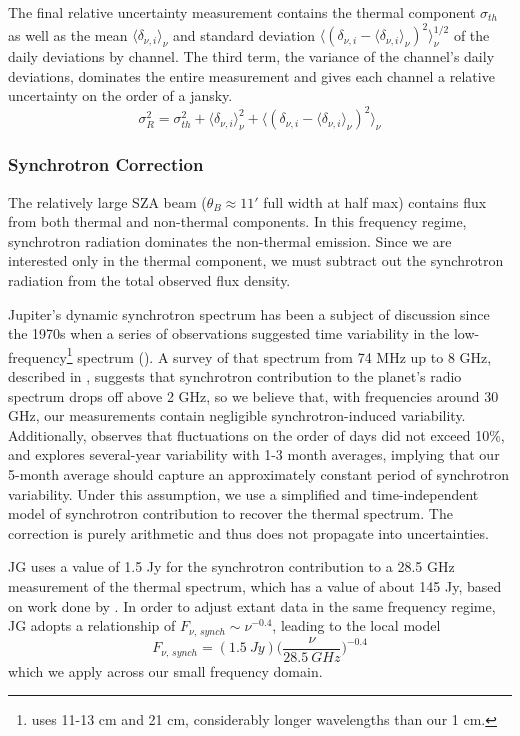 \documentclass{article}
\begin{document}
	The final relative uncertainty measurement contains the thermal component $\sigma_{th}$ as well as the mean $\langle \delta_{\nu, i} \rangle_{\nu}$ and standard deviation $\Big\langle (\delta_{\nu, i} - \langle \delta_{\nu, i} \rangle_{\nu})^{2} \Big\rangle_{\nu}^{1/2}$ of the daily deviations by channel.
	The third term, the variance of the channel's daily deviations, dominates the entire measurement and gives each channel a relative uncertainty on the order of a jansky.
	$$ \sigma_{R}^{2} = \sigma_{th}^{2} + \langle \delta_{\nu, i} \rangle_{\nu}^{2}
		 + \Big\langle (\delta_{\nu, i} - \langle \delta_{\nu, i} \rangle_{\nu})^{2} \Big\rangle_{\nu} $$


\subsubsection{Synchrotron Correction}

	The relatively large SZA beam ($\theta_{B} \approx 11'$ full width at half max) contains flux from both thermal and non-thermal components.
	In this frequency regime, synchrotron radiation dominates the non-thermal emission.
	Since we are interested only in the thermal component, we must subtract out the synchrotron radiation from the total observed flux density.

	Jupiter's dynamic synchrotron spectrum has been a subject of discussion since the 1970s when a series of observations suggested time variability in the low-frequency\footnote{\citealt{1976JGR....81.3380K} uses 11-13 cm and 21 cm, considerably longer wavelengths than our 1 cm.} spectrum (\citealt{1976JGR....81.3380K}).
	A survey of that spectrum from 74 MHz up to 8 GHz, described in \citealt{2003Icar..163..434D}, suggests that synchrotron contribution to the planet's radio spectrum drops off above 2 GHz, so we believe that, with frequencies around 30 GHz, our measurements contain negligible synchrotron-induced variability.
	Additionally, \citealt{1976JGR....81.3380K} observes that fluctuations on the order of days did not exceed 10\%, and explores several-year variability with 1-3 month averages, implying that our 5-month average should capture an approximately constant period of synchrotron variability.
	Under this assumption, we use a simplified and time-independent model of synchrotron contribution to recover the thermal spectrum.
	The correction is purely arithmetic and thus does not propagate into uncertainties.

	JG uses a value of 1.5 Jy for the synchrotron contribution to a 28.5 GHz measurement of the thermal spectrum, which has a value of about 145 Jy, based on work done by \citealt{2003Icar..163..449D}.
	In order to adjust extant data in the same frequency regime, JG adopts a relationship of $F_{\nu,\,synch} \sim \nu^{-0.4}$, leading to the local model
	$$F_{\nu,\,synch} =  (1.5 \ Jy)\Bigg(\frac{\nu}{28.5 \ GHz}\Bigg)^{-0.4}$$
	which we apply across our small frequency domain.
\end{document}

